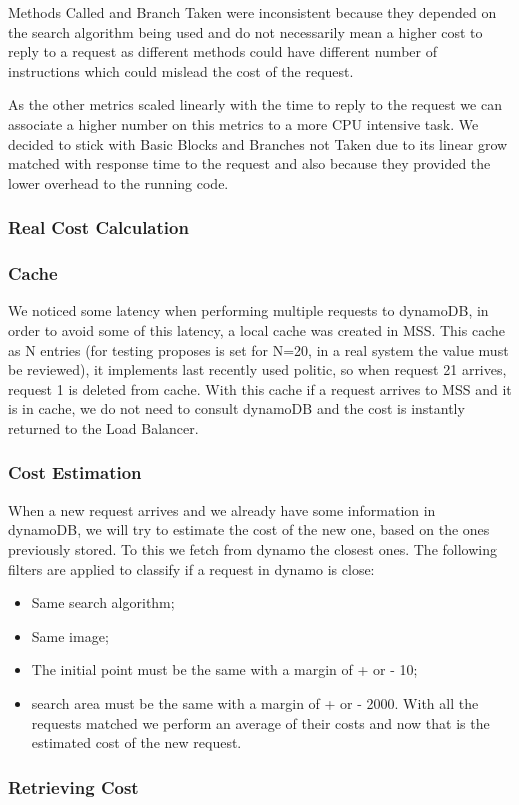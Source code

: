 \documentclass[times, 10pt,twocolumn]{article}
\begin{document}
   Methods Called and Branch Taken were inconsistent because they depended on 
   the search algorithm being used and do not necessarily mean a higher cost to 
   reply to a request as different methods could have different number of instructions
   which could mislead the cost of the request.

   As the other metrics scaled linearly with the time to reply to the request we can
   associate a higher number on this metrics to a more CPU intensive task.
   We decided to stick with Basic Blocks and Branches not Taken due to its 
   linear grow matched with response time to the request and also because they provided
   the lower overhead to the running code. 

\subsubsection{Real Cost Calculation}
\subsubsection{Cache}
   We noticed some latency when performing multiple requests to dynamoDB, in order to
   avoid some of this latency, a local cache was created in MSS. This cache as N entries (for 
   testing proposes is set for N=20, in a real system the value must be reviewed), it implements 
   last recently used politic, so when request 21 arrives, request 1 is deleted from cache. With this cache
   if a request arrives to MSS and it is in cache, we do not need to consult dynamoDB and the cost is instantly returned
   to the Load Balancer. 

\subsubsection{Cost Estimation}
   When a new request arrives and we already have some information in dynamoDB, we will try to estimate the cost of the 
   new one, based on the ones previously stored. To this we fetch from dynamo the closest ones. The following filters 
   are applied to classify if a request in dynamo is close:
	\begin{itemize}
	\item Same search algorithm;
	\item Same image;
	\item The initial point must be the same with a margin of + or - 10;
	\item search area must be the same with a margin of + or - 2000.
   With all the requests matched we perform an average of their costs and now that is the estimated cost of the new 
   request.
\end{itemize}

\subsubsection{Retrieving Cost}
\end{document}
